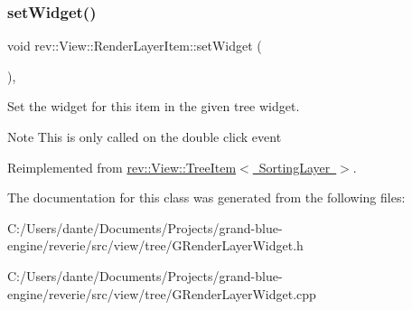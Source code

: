 \subsubsection{\texorpdfstring{setWidget()}{setWidget()}}
{\footnotesize\ttfamily void rev\+::\+View\+::\+Render\+Layer\+Item\+::set\+Widget (\begin{DoxyParamCaption}{ }\end{DoxyParamCaption})\hspace{0.3cm}{\ttfamily [override]}, {\ttfamily [virtual]}}



Set the widget for this item in the given tree widget. 

\begin{DoxyNote}{Note}
This is only called on the double click event 
\end{DoxyNote}


Reimplemented from \mbox{\hyperlink{classrev_1_1_view_1_1_tree_item_a24faa4e374ec0728c7eda8f50ca575df}{rev\+::\+View\+::\+Tree\+Item$<$ Sorting\+Layer $>$}}.



The documentation for this class was generated from the following files\+:\begin{DoxyCompactItemize}
\item 
C\+:/\+Users/dante/\+Documents/\+Projects/grand-\/blue-\/engine/reverie/src/view/tree/G\+Render\+Layer\+Widget.\+h\item 
C\+:/\+Users/dante/\+Documents/\+Projects/grand-\/blue-\/engine/reverie/src/view/tree/G\+Render\+Layer\+Widget.\+cpp\end{DoxyCompactItemize}
